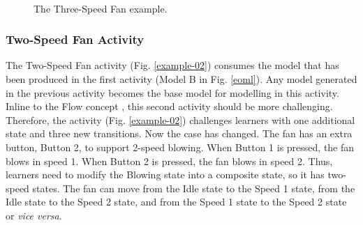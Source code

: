 \documentclass[conference]{IEEEtran}
\begin{document}
\begin{figure}[!t]
    \centering
    \\
	\caption{The Three-Speed Fan example.}
    \label{example-03}
\end{figure}

\subsubsection{Two-Speed Fan Activity}
The Two-Speed Fan activity (Fig. \ref{example-02}) consumes the model that has been produced in the first activity (Model B in Fig. \ref{eoml}). Any model generated in the previous activity becomes the base model for modelling in this activity. Inline to the Flow concept \cite{csikszentmihalyi2014toward}, this second activity should be more challenging. Therefore, the activity (Fig. \ref{example-02}) challenges learners with one additional state and three new transitions. Now the case has changed. The fan has an extra button, Button 2, to support 2-speed blowing. When Button 1 is pressed, the fan blows in speed 1. When Button 2 is pressed, the fan blows in speed 2. Thus, learners need to modify the Blowing state into a composite state, so it has two-speed states. The fan can move from the Idle state to the Speed 1 state, from the Idle state to the Speed 2 state, and from the Speed 1 state to the Speed 2 state or \textit{vice versa}.
\end{document}
